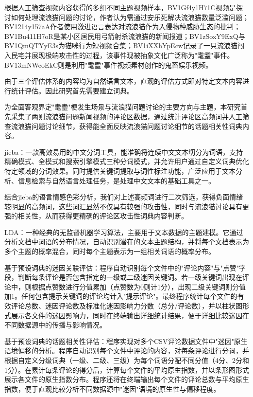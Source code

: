 \documentclass[12pt,a4paper]{ctexart}
\begin{document}
根据人工筛查视频内容获得的多组不同主题视频样本，BV1Gf4y1H71C视频是探讨如何处理流浪猫问题的讨论，作者认为需通过安乐死解决流浪猫数量泛滥问题；BV1214y157aA作者使用激进语言表达对流浪猫作为入侵物种威胁生态的批判；BV1Bu411H7oR是某小区居民用弓箭射杀流浪猫的新闻报道；BV1zSoxY9ExQ与BV1QmQTYyE3s为猫咪行为短视频合集；BV1iXXhYpEcw记录了一只流浪猫闯入民宅并展现极端攻击性的过程，该事件现被抽象文化广泛称为"耄耋"事件。BV13mNWeoEkC则是利用"耄耋"事件视频素材创作的鬼畜娱乐视频。

由于三个评估体系的内容均为自然语言文本，直观的评估方式即对特定文本内容进行统计评估。因此研究首先需要建立词典。

为全面客观界定"耄耋"梗发生场景与流浪猫问题讨论的主要方向与主题，本研究首先采集了两则流浪猫问题新闻视频的评论区数据，通过统计评论区高频词并人工筛查流浪猫问题讨论细节，获得能全面反映流浪猫问题讨论细节的话题相关性词典内容。

jieba：一款高效易用的中文分词工具，能准确将连续中文文本切分为词语，支持精确模式、全模式和搜索引擎模式三种分词模式，并允许用户通过自定义词典优化特定领域的分词效果。同时提供关键词提取与词性标注功能，广泛应用于文本分析、信息检索与自然语言处理任务，是处理中文文本的基础工具之一。

结合jieba的语言情感色彩分析，我们对上述高频词进行二次筛选，获得负面情绪较明显的高频词，这些词汇显然不仅具有较强的攻击性，同时与流浪猫讨论具有更强的相关性，从而获得更精确的评论区攻击性词典内容判断。

LDA：一种经典的无监督机器学习算法，主要用于文本数据的主题建模。它通过分析文档中词语的分布情况，自动识别潜在的文本主题结构，并将每个文档表示为多个主题的概率混合，同时每个主题表示为一组相关词语的概率分布。

基于预设词典的迷因关联评估：程序自动识别每个文件中的"评论内容"与"点赞"字段，判断每条评论是否包含指定的一级或二级迷因关键词。若一级关键词出现在评论中，则根据点赞数进行分值累加（点赞数为0则计1分），出现二级关键词则分值加1。任何包含提示关键词的评论均计入"提示评论"。最终程序统计每个文件的有效评论总数、迷因评论数及标准化迷因影响力分数（总分/评论数），并以柱状图形式展示各文件的迷因影响力，同时在终端输出详细统计结果，便于详细比较迷因在不同数据源中的传播与影响情况。

基于预设词典的话题相关性评估：程序实现对多个CSV评论数据文件中"迷因"原生语境偏移的分析。程序自动识别每个文件中评论的内容，对每条评论进行分词，并根据自定义分级词典（一级、二级、三级）为每个词语分配不同分值（4分、2分和1分）。在累计每条评论的得分后，计算每个文件的平均原生指数，并以条形图形式展示各文件的原生指数分布。程序还将在终端输出每个文件的评论总数与平均原生指数，便于直观比较分析不同数据源中"迷因"语境的原生性与偏移程度。
\end{document}
